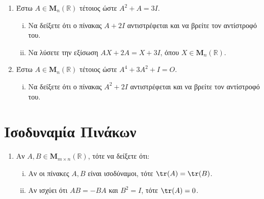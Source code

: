\begin{enumerate}
  \item Έστω $ A \in \textbf{M}_{n}(\mathbb{R}) $ τέτοιος ώστε $ A^{2}+A=3I $. 
    \begin{enumerate}[i)]
      \item Να δείξετε ότι ο πίνακας $ A+2I $ αντιστρέφεται και να βρείτε τον αντίστροφό
        του.
      \item Να λύσετε την εξίσωση $ AX+2A=X+3I $, όπου 
        $ X \in \textbf{M}_{n}(\mathbb{R}) $.
    \end{enumerate}

  \item Έστω $ A \in \textbf{M}_{n}(\mathbb{R}) $ τέτοιος ώστε $ A^{4}+3A^{2}+I=O $. 
    \begin{enumerate}[i)]
      \item Να δείξετε ότι ο πίνακας $ A^{2}+2I $ αντιστρέφεται και να βρείτε τον 
        αντίστροφό του.
    \end{enumerate}


\end{enumerate}

\section*{Ισοδυναμία Πινάκων}

\begin{enumerate}
  \item Αν $ A,B \in \textbf{M}_{m \times n}(\mathbb{R}) $, τότε να δείξετε ότι:
    \begin{enumerate}[i)]
      \item Αν οι πίνακες $ A,B $ είναι ισοδύναμοι, τότε $ \tr(A)=\tr(B) $.
      \item Αν ισχύει ότι $ AB=-BA $ και $ B^{2}=I $, τότε $ \tr(A)=0 $.
    \end{enumerate}
\end{enumerate}







